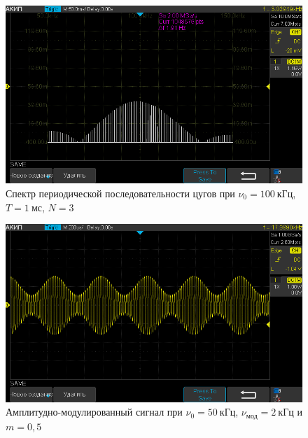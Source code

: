 \documentclass[a4paper, 12pt]{article}
\begin{document}
\begin{figure}[h!]
\begin{flushleft}
    \includegraphics[scale=0.5]{AKIP0013.png}
\end{flushleft}
\caption{Спектр периодической последовательности цугов при $\nu_0 = 100~кГц$, $T = 1~мс$, $N = 3$}
\label{ris19}
\end{figure}

\begin{figure}[h!]
\begin{flushleft}
    \includegraphics[scale=0.5]{AKIP0014.png}
\end{flushleft}
\caption{Амплитудно-модулированный сигнал при $\nu_0 = 50~кГц$, $\nu_{мод} = 2~кГц$ и $m = 0,5$}
\label{ris20}
\end{figure}
\end{document}
